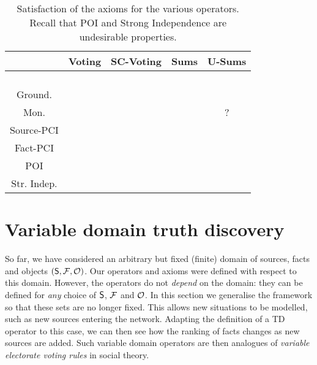 \begin{table}
\newcommand{\yes}{\checkmark}
\newcommand{\no}{\sffamily{X}}
\newcommand{\notsure}{?}
\centering
    \caption{Satisfaction of the axioms for the various operators. Recall that
    POI and Strong Independence are undesirable properties.}
    \begin{tabular}{c c c c c}
        \toprule
                         & Voting & SC-Voting  & Sums & U-Sums   \\
        \midrule
        \sourcecoherence{} & \no    & \yes       & \yes & \yes     \\
        \factcoherence{}   & \yes   & \no        & \yes & \yes     \\
        \symmetry{}         & \yes   & \yes       & \yes & \yes     \\
        \unanimity{}        & \yes   & \yes       & \yes & \yes     \\
        Ground.          & \yes   & \yes       & \yes & \yes     \\
        Mon.             & \yes   & \yes       & \no  & \notsure \\
        Source-PCI       & \yes   & \no        & \no  & \yes     \\
        Fact-PCI         & \yes   & \yes       & \no  & \yes     \\
        \hline
        POI              & \yes   & \yes       & \no  & \no      \\
        Str. Indep.      & \yes   & \yes       & \no  & \no      \\
        \bottomrule
    \end{tabular}
\label{td_table_axioms}
\end{table}

\section{Variable domain truth discovery}
\label{td_sec_variable_domain}

So far, we have considered an arbitrary but fixed (finite) domain of sources,
facts and objects $(\S, \F, \O)$. Our operators and axioms were defined with
respect to this domain. However, the operators do not \emph{depend} on the
domain: they can be defined for \emph{any} choice of $\S$, $\F$ and $\O$. In
this section we generalise the framework so that these sets are no longer
fixed. This allows new situations to be modelled, such as new sources entering
the network. Adapting the definition of a TD operator to this case, we can then
see how the ranking of facts changes as new sources are added. Such variable
domain operators are then analogues of \emph{variable electorate voting rules}
in social theory.


